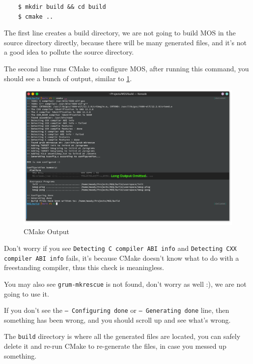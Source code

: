 \begin{verbatim}
    $ mkdir build && cd build
    $ cmake ..
\end{verbatim}

The first line creates a build directory, we are not going to build MOS in the source directory
directly, because there will be many generated files, and it's not a good idea to pollute the
source directory.

The second line runs CMake to configure MOS, after running this command, you should see a
bunch of output, similar to \ref{fig:cmake-output}.

\begin{figure}[h]
    \centering
    \includegraphics[width=\textwidth]{assets/c1.mos-cmake-configure.png}
    \caption{CMake Output}
    \label{fig:cmake-output}
\end{figure}

\begin{note}
    \item Don't worry if you see \texttt{Detecting C compiler ABI info} and
    \texttt{Detecting CXX compiler ABI info} fails, it's because CMake doesn't know what to do
    with a freestanding compiler, thus this check is meaningless.

    \item You may also see \texttt{grum-mkrescue} is not found, don't worry as well :), we are
    not going to use it.
\end{note}

If you don't see the \texttt{-- Configuring done} or \texttt{-- Generating done} line, then
something has been wrong, and you should scroll up and see what's wrong.

\begin{tip}
    \item The \texttt{build} directory is where all the generated files are located, you can
    safely delete it and re-run CMake to re-generate the files, in case you messed up something.
\end{tip}


